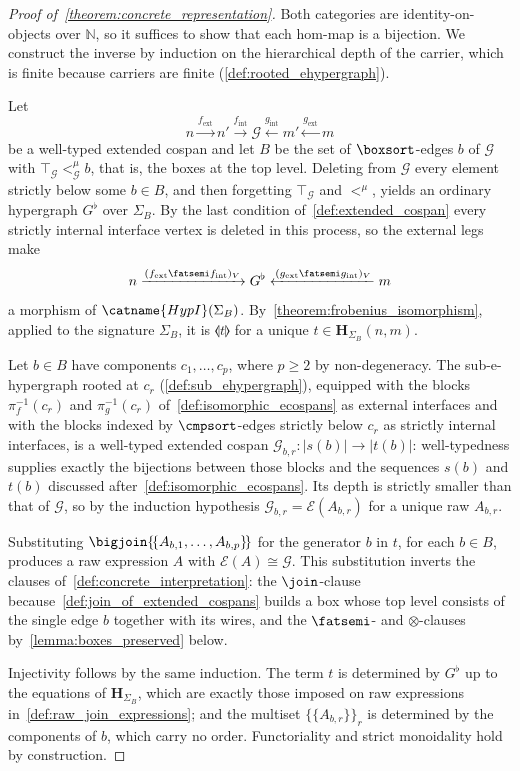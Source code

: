 \begin{proof}[Proof of~\cref{theorem:concrete_representation}]
Both categories are identity-on-objects over $\mathbb{N}$, so it suffices to show that
each hom-map is a bijection.
We construct the inverse by induction on the hierarchical depth of the carrier, which is
finite because carriers are finite (\cref{def:rooted_ehypergraph}).

Let
\[
n \xrightarrow{f_{\mathrm{ext}}} n' \xrightarrow{f_{\mathrm{int}}} \mathcal{G}
  \xleftarrow{g_{\mathrm{int}}} m' \xleftarrow{g_{\mathrm{ext}}} m
\]
be a well-typed extended cospan and let $B$ be the set of $\boxsort$-edges $b$ of
$\mathcal{G}$ with $\top_{\mathcal{G}} <^{\mu}_{\mathcal{G}} b$, that is, the boxes at the
top level.
Deleting from $\mathcal{G}$ every element strictly below some $b \in B$, and then
forgetting $\top_{\mathcal{G}}$ and $<^{\mu}$, yields an ordinary hypergraph
$G^{\flat}$ over $\Sigma_{B}$.
By the last condition of~\cref{def:extended_cospan} every strictly internal interface
vertex is deleted in this process, so the external legs make
\[
n \xrightarrow{(f_{\mathrm{ext}} \fatsemi f_{\mathrm{int}})_{V}} G^{\flat}
  \xleftarrow{(g_{\mathrm{ext}} \fatsemi g_{\mathrm{int}})_{V}} m
\]
a morphism of $\catname{HypI}(\Sigma_{B})$.
By~\cref{theorem:frobenius_isomorphism}, applied to the signature $\Sigma_{B}$, it is
$\llangle t \rrangle$ for a unique $t \in \mathbf{H}_{\Sigma_{B}}(n,m)$.

Let $b \in B$ have components $c_{1}, \ldots, c_{p}$, where $p \geq 2$ by
non-degeneracy.
The sub-e-hypergraph rooted at $c_{r}$ (\cref{def:sub_ehypergraph}), equipped with the
blocks $\pi_{f}^{-1}(c_{r})$ and $\pi_{g}^{-1}(c_{r})$ of~\cref{def:isomorphic_ecospans}
as external interfaces and with the blocks indexed by $\cmpsort$-edges strictly below
$c_{r}$ as strictly internal interfaces, is a well-typed extended cospan
$\mathcal{G}_{b,r} : |s(b)| \to |t(b)|$: well-typedness supplies exactly the bijections
between those blocks and the sequences $s(b)$ and $t(b)$ discussed
after~\cref{def:isomorphic_ecospans}.
Its depth is strictly smaller than that of $\mathcal{G}$, so by the induction hypothesis
$\mathcal{G}_{b,r} = \mathcal{E}(A_{b,r})$ for a unique raw $A_{b,r}$.

Substituting $\bigjoin\{\!\{A_{b,1},\ldots,A_{b,p}\}\!\}$ for the generator $b$ in $t$,
for each $b \in B$, produces a raw expression $A$ with $\mathcal{E}(A) \cong \mathcal{G}$.
This substitution inverts the clauses of~\cref{def:concrete_interpretation}: the
$\join$-clause because~\cref{def:join_of_extended_cospans} builds a box whose top level
consists of the single edge $b$ together with its wires, and the $\fatsemi$- and
$\otimes$-clauses by~\cref{lemma:boxes_preserved} below.

Injectivity follows by the same induction.
The term $t$ is determined by $G^{\flat}$ up to the equations of
$\mathbf{H}_{\Sigma_{B}}$, which are exactly those imposed on raw expressions
in~\cref{def:raw_join_expressions}; and the multiset $\{\!\{A_{b,r}\}\!\}_{r}$ is
determined by the components of $b$, which carry no order.
Functoriality and strict monoidality hold by construction.
\end{proof}

